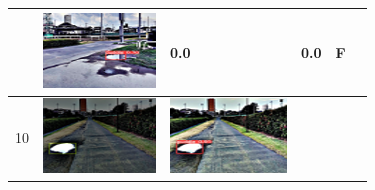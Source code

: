 \documentclass[10pt]{jarticle}
\begin{document}
\begin{table}[H]
\begin{tabular}{|l|l|l|l|l|l|}
\begin{minipage}{.1\textwidth}
           \end{minipage}       & \begin{minipage}{.1\textwidth}
            \centering
            \includegraphics[width=0.9\linewidth]{./fig/2tab9_r.png}
           \end{minipage}       & 0.0 & 0.0 & F      \\ \hline
        10 & \begin{minipage}{.1\textwidth}
            \centering
            \includegraphics[width=0.9\linewidth]{./fig/2tab10_a.png}
           \end{minipage}       & \begin{minipage}{.1\textwidth}
            \centering
            \includegraphics[width=0.9\linewidth]{./fig/2tab10_r.png}

\end{minipage}
\end{tabular}
\end{table}
\end{document}
